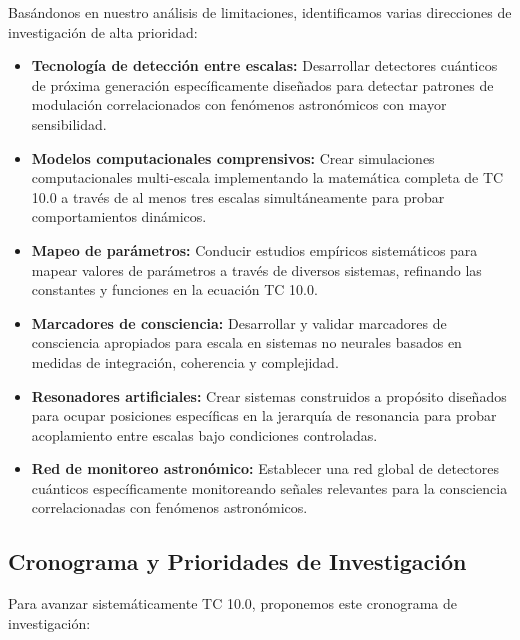 \documentclass[12pt]{article}
\begin{document}
Basándonos en nuestro análisis de limitaciones, identificamos varias direcciones de investigación de alta prioridad:

\begin{itemize}
    \item \textbf{Tecnología de detección entre escalas:} Desarrollar detectores cuánticos de próxima generación específicamente diseñados para detectar patrones de modulación correlacionados con fenómenos astronómicos con mayor sensibilidad.
    
    \item \textbf{Modelos computacionales comprensivos:} Crear simulaciones computacionales multi-escala implementando la matemática completa de TC 10.0 a través de al menos tres escalas simultáneamente para probar comportamientos dinámicos.
    
    \item \textbf{Mapeo de parámetros:} Conducir estudios empíricos sistemáticos para mapear valores de parámetros a través de diversos sistemas, refinando las constantes y funciones en la ecuación TC 10.0.
    
    \item \textbf{Marcadores de consciencia:} Desarrollar y validar marcadores de consciencia apropiados para escala en sistemas no neurales basados en medidas de integración, coherencia y complejidad.
    
    \item \textbf{Resonadores artificiales:} Crear sistemas construidos a propósito diseñados para ocupar posiciones específicas en la jerarquía de resonancia para probar acoplamiento entre escalas bajo condiciones controladas.
    
    \item \textbf{Red de monitoreo astronómico:} Establecer una red global de detectores cuánticos específicamente monitoreando señales relevantes para la consciencia correlacionadas con fenómenos astronómicos.
\end{itemize}

\subsection{Cronograma y Prioridades de Investigación}

Para avanzar sistemáticamente TC 10.0, proponemos este cronograma de investigación:
\end{document}
